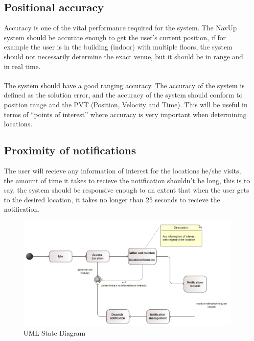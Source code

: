 \subsection{Positional accuracy}
Accuracy is one of the vital performance required for the system. The NavUp system should be accurate enough to get the user’s current position, if for example the user is in the building (indoor) with multiple floors, the system should not necessarily determine the exact venue, but it should be in range and	in real time.\\\\ 
The system should have a good ranging accuracy. The accuracy of the system is defined as the solution error, and the accuracy of the system should conform to position range and the PVT (Position, Velocity and Time). This will be useful in terms of “points of interest” where accuracy is very important when determining locations.

\subsection{Proximity of notifications}
The user will recieve any information of interest for the locations he/she visits, the amount of time it takes to recieve the notification shouldn't be long, this is to say, the system should be responsive enough to an extent that when the user gets to the desired location, it takes no longer than 25 seconds to recieve the notification.
  
\begin{figure}[H]
\includegraphics[width=\textwidth]{StateDiagram}
\caption{UML State Diagram}
\end{figure}
		
